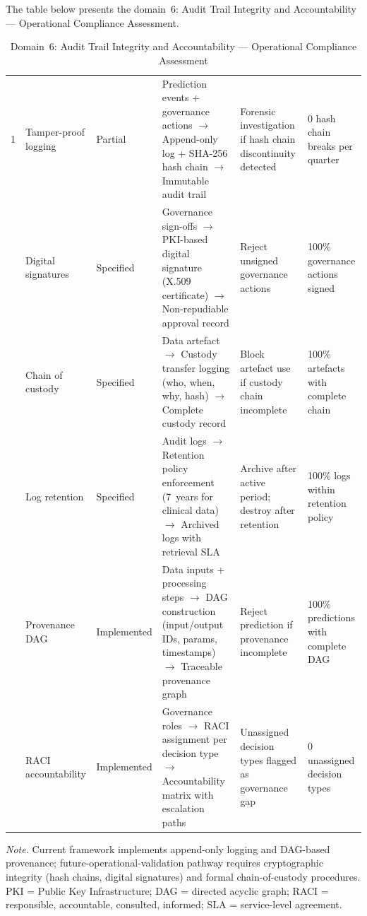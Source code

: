 \noindent The table below presents the domain~6: Audit Trail Integrity and Accountability --- Operational Compliance Assessment.

\begin{table}[H]
\tablestripes
\tablefontsize
\caption[Audit Trail Integrity and Accountability Assessment]{Domain~6: Audit Trail Integrity and Accountability --- Operational Compliance Assessment}
\begin{tabularx}{\textwidth}{@{} p{0.4cm} p{2cm} p{1.4cm} L L p{1.8cm} @{}}
\toprule
\thead{\#} &  &  &  &  &  \\
 & Tamper-proof logging & Partial & Prediction events + governance actions $\to$ Append-only log + SHA-256 hash chain $\to$ Immutable audit trail & Forensic investigation if hash chain discontinuity detected & 0 hash chain breaks per quarter \\
 & Digital signatures & Specified & Governance sign-offs $\to$ PKI-based digital signature (X.509 certificate) $\to$ Non-repudiable approval record & Reject unsigned governance actions & 100\% governance actions signed \\
 & Chain of custody & Specified & Data artefact $\to$ Custody transfer logging (who, when, why, hash) $\to$ Complete custody record & Block artefact use if custody chain incomplete & 100\% artefacts with complete chain \\
 & Log retention & Specified & Audit logs $\to$ Retention policy enforcement (7~years for clinical data) $\to$ Archived logs with retrieval SLA & Archive after active period; destroy after retention & 100\% logs within retention policy \\
 & Provenance DAG & Implemented & Data inputs + processing steps $\to$ DAG construction (input/output IDs, params, timestamps) $\to$ Traceable provenance graph & Reject prediction if provenance incomplete & 100\% predictions with complete DAG \\
 & RACI accountability & Implemented & Governance roles $\to$ RACI assignment per decision type $\to$ Accountability matrix with escalation paths & Unassigned decision types flagged as governance gap & 0 unassigned decision types \\
\bottomrule
\end{tabularx}
\vspace{0.5em}\noindent\textit{Note.} Current framework implements append-only logging and DAG-based provenance; future-operational-validation pathway requires cryptographic integrity (hash chains, digital signatures) and formal chain-of-custody procedures. PKI = Public Key Infrastructure; DAG = directed acyclic graph; RACI = responsible, accountable, consulted, informed; SLA = service-level agreement.
\end{table}

